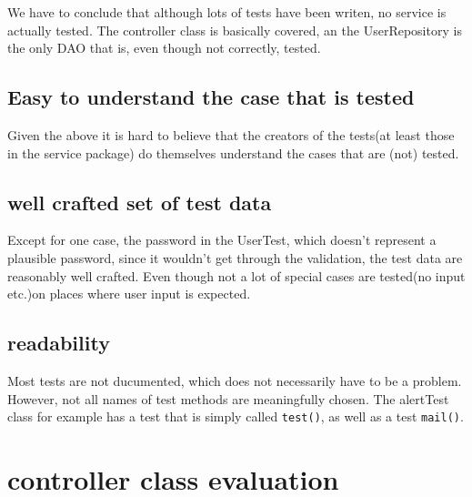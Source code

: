 \documentclass[a4wide]{article}
\begin{document}
We have to conclude that although lots of tests have been writen, no service is actually tested. The controller class is basically covered, an the UserRepository is the only DAO that is, even though not correctly, tested. 
\subsection{Easy to understand the case that is tested}
Given the above it is hard to believe that the creators of the tests(at least those in the service package) do themselves understand the cases that are (not) tested. 
\subsection{well crafted set of test data}
Except for one case, the password in the UserTest, which doesn't represent a plausible password, since it wouldn't get through the validation, the test data are reasonably well crafted. Even though not a lot of special cases are tested(no input etc.)on places where user input is expected. 
\subsection{readability}
Most tests are not ducumented, which does not necessarily have to be a problem. However, not all names of test methods are meaningfully chosen. The alertTest class for example has a test that is simply called \texttt{test()}, as well as a test \texttt{mail()}. 
\section{controller class evaluation}
\end{document}
